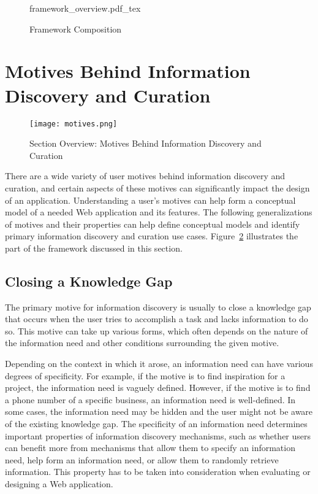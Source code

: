 \begin{figure}[ht!]
	\noindent
	\centering
	{framework_overview.pdf_tex}	\caption{Framework Composition}
	\label{fig:framework_overview} 
\end{figure}
\clearpage

{\section{Motives Behind Information Discovery and Curation}

\label{section:motives}
\begin{figure}[ht!]
	\noindent
	\centering
	\texttt{[image: motives.png]}
	\caption{Section Overview: Motives Behind Information Discovery and Curation}
	\label{fig:motives} 
\end{figure}

There are a wide variety of user motives behind information discovery and curation, and certain aspects of these motives can significantly impact the design of an application. Understanding a user's motives can help form a conceptual model of a needed Web application and its features. The following generalizations of motives and their properties can help define conceptual models and identify primary information discovery and curation use cases. Figure~\ref{fig:motives} illustrates the part of the framework discussed in this section.  

{\subsection{Closing a Knowledge Gap}
The primary motive for information discovery is usually to close a knowledge gap that occurs when the user tries to accomplish a task and lacks information to do so. This motive can take up various forms, which often depends on the nature of the information need and other conditions surrounding the given motive.        

Depending on the context in which it arose, an information need can have various degrees of specificity. For example, if the motive is to find inspiration for a project, the information need is vaguely defined. However, if the motive is to find a phone number of a specific business, an information need is well-defined. In some cases, the information need may be hidden and the user might not be aware of the existing knowledge gap. The specificity of an information need determines important properties of information discovery mechanisms, such as whether users can benefit more from mechanisms that allow them to specify an information need, help form an information need, or allow them to randomly retrieve information. This property has to be taken into consideration when evaluating or designing a Web application. 

}}
